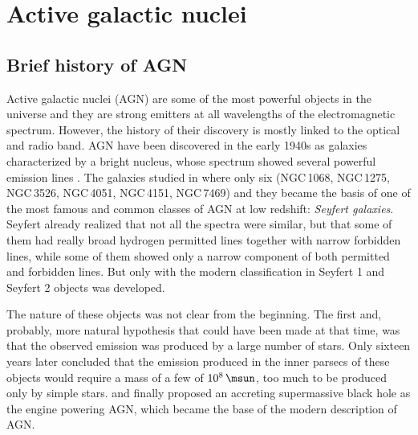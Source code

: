 \documentclass[../thesis.tex]{subfiles}
\begin{document}
\chapter{Active galactic nuclei}
\label{cap:agn}

\section{Brief history of AGN}
\label{sec:intro_history}
Active galactic nuclei (AGN) are some of the most powerful objects in the universe and they are strong emitters at all wavelengths of the electromagnetic spectrum.
However, the history of their discovery is mostly linked to the optical and radio band.
AGN have been discovered in the early 1940s as galaxies characterized by a bright nucleus, whose spectrum showed several powerful emission lines \citep{Seyfert43}.
The galaxies studied in \citet{Seyfert43} where only six (NGC\,1068, NGC\,1275, NGC\,3526, NGC\,4051, NGC\,4151, NGC\,7469) and they became the basis of one of the most famous and common classes of AGN at low redshift: \emph{Seyfert galaxies}. 
Seyfert already realized that not all the spectra were similar, but that some of them had really broad hydrogen permitted lines together with narrow forbidden lines, while some of them showed only a narrow component of both permitted and forbidden lines. 
But only with \citet{Khachikian74} the modern classification in Seyfert 1 and Seyfert 2 objects was developed.

The nature of these objects was not clear from the beginning.
The first and, probably, more natural hypothesis that could have been made at that time, was that the observed emission was produced by a large number of stars.
Only sixteen years later \citet{Woltjer59} concluded that the emission produced in the inner parsecs of these objects would require a mass of a few of $10^8\,\si{\msun}$, too much to be produced only by simple stars.
\citet{Salpeter64} and \citet{Zeldovich64} finally proposed an accreting supermassive black hole as the engine powering AGN, which became the base of the modern description of AGN. 
\end{document}

